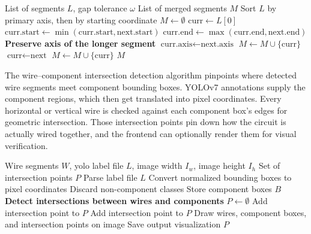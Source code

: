 \begin{algorithm}
\caption{Collinear Segment Merging}
\label{algo:segment-merging-impl}
\begin{algorithmic}
\Require List of segments $L$, gap tolerance $\omega$
\Ensure List of merged segments $M$
\State Sort $L$ by primary axis, then by starting coordinate
\State $M \leftarrow \emptyset$
\State $\text{curr} \leftarrow L[0]$
        \State $\text{curr.start} \leftarrow \min(\text{curr.start}, \text{next.start})$
        \State $\text{curr.end} \leftarrow \max(\text{curr.end}, \text{next.end})$
            \State \textbf{Preserve axis of the longer segment}
            \State $\text{curr.axis} \leftarrow \text{next.axis}$
        \EndIf
    \Else
        \State $M \leftarrow M \cup \{\text{curr}\}$
        \State $\text{curr} \leftarrow \text{next}$
    \EndIf
\EndFor
\State $M \leftarrow M \cup \{\text{curr}\}$
\State \Return $M$
\end{algorithmic}
\end{algorithm}

The wire–component intersection detection algorithm pinpoints where detected wire segments meet component bounding boxes. YOLOv7 annotations supply the component regions, which then get translated into pixel coordinates. Every horizontal or vertical wire is checked against each component box's edges for geometric intersection. Those intersection points pin down how the circuit is actually wired together, and the frontend can optionally render them for visual verification.

\begin{algorithm}
\caption{Wire-Component Intersection Detection}
\label{algo:wire-component-intersection-impl}
\begin{algorithmic}
\Require Wire segments $W$, \gls{yolo} label file $L$, image width $I_w$, image height $I_h$
\Ensure Set of intersection points $P$
\State Parse label file $L$
\State Convert normalized bounding boxes to pixel coordinates
\State Discard non-component classes
\State Store component boxes $B$
\State \textbf{Detect intersections between wires and components}
\State $P \leftarrow \emptyset$
            \State Add intersection point to $P$
            \State Add intersection point to $P$
        \EndIf
    \EndFor
\EndFor
\State Draw wires, component boxes, and intersection points on image
\State Save output visualization
\State \Return $P$
\end{algorithmic}
\end{algorithm}

